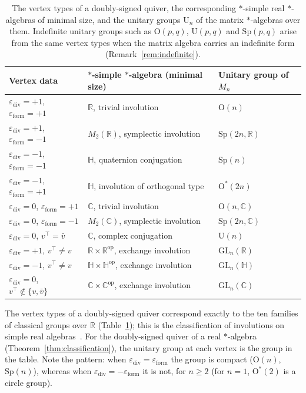 \documentclass[12pt, a4paper]{report}
\theoremstyle{plain}
\theoremstyle{definition}
\theoremstyle{remark}
\theoremstyle{plain}
\newcommand{\epsilondiv}{\varepsilon_{\mathrm{div}}}
\newcommand{\epsilonform}{\varepsilon_{\mathrm{form}}}
\newcommand{\RR}{\mathbb{R}}
\newcommand{\CC}{\mathbb{C}}
\newcommand{\HH}{\mathbb{H}}
\newcommand{\GL}{\mathrm{GL}}
\newcommand{\Or}{\mathrm{O}}
\newcommand{\Un}{\mathrm{U}}
\newcommand{\Sp}{\mathrm{Sp}}
\begin{document}
\begin{table}[htbp]
\centering
\caption{The vertex types of a doubly-signed quiver, the corresponding $*$-simple real $*$-algebras of minimal size, and the unitary groups $\Un_n$ of the matrix $*$-algebras over them. Indefinite unitary groups such as $\Or(p,q)$, $\Un(p,q)$ and $\Sp(p,q)$ arise from the same vertex types when the matrix algebra carries an indefinite form (Remark~\ref{rem:indefinite}).}
\label{tab:vertex-types}
\small
\renewcommand{\arraystretch}{1.2}
\begin{tabular}{@{}lll@{}}
\toprule
\textbf{Vertex data} & \textbf{$*$-simple $*$-algebra (minimal size)} & \textbf{Unitary group of $M_n$} \\
\midrule
$\epsilondiv=+1$, $\epsilonform=+1$ & $\RR$, trivial involution & $\Or(n)$ \\
$\epsilondiv=+1$, $\epsilonform=-1$ & $M_2(\RR)$, symplectic involution & $\Sp(2n,\RR)$ \\
$\epsilondiv=-1$, $\epsilonform=-1$ & $\HH$, quaternion conjugation & $\Sp(n)$ \\
$\epsilondiv=-1$, $\epsilonform=+1$ & $\HH$, involution of orthogonal type & $\Or^*(2n)$ \\
$\epsilondiv=0$, $\epsilonform=+1$ & $\CC$, trivial involution & $\Or(n,\CC)$ \\
$\epsilondiv=0$, $\epsilonform=-1$ & $M_2(\CC)$, symplectic involution & $\Sp(2n,\CC)$ \\
$\epsilondiv=0$, $v^{\top}=\bar v$ & $\CC$, complex conjugation & $\Un(n)$ \\
$\epsilondiv=+1$, $v^{\top}\neq v$ & $\RR\times\RR^{\mathrm{op}}$, exchange involution & $\GL_n(\RR)$ \\
$\epsilondiv=-1$, $v^{\top}\neq v$ & $\HH\times\HH^{\mathrm{op}}$, exchange involution & $\GL_n(\HH)$ \\
$\epsilondiv=0$, $v^{\top}\notin\{v,\bar v\}$ & $\CC\times\CC^{\mathrm{op}}$, exchange involution & $\GL_n(\CC)$ \\
\bottomrule
\end{tabular}
\end{table}

The vertex types of a doubly-signed quiver correspond exactly to the ten families of classical groups over $\RR$ (Table~\ref{tab:vertex-types}); this is the classification of involutions on simple real algebras~\cite{KMRT1998,Weyl1939,Helgason1978}. For the doubly-signed quiver of a real $*$-algebra (Theorem~\ref{thm:classification}), the unitary group at each vertex is the group in the table. Note the pattern: when $\epsilondiv=\epsilonform$ the group is compact ($\Or(n)$, $\Sp(n)$), whereas when $\epsilondiv=-\epsilonform$ it is not, for $n\geq2$ (for $n=1$, $\Or^*(2)$ is a circle group).
\end{document}
